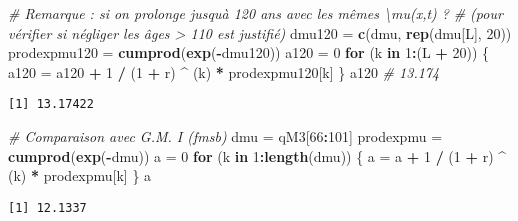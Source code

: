 \documentclass[
]{article}
\newenvironment{Shaded}{\begin{snugshade}}{\end{snugshade}}
\newcommand{\CommentTok}[1]{\textcolor[rgb]{0.56,0.35,0.01}{\textit{#1}}}
\newcommand{\ControlFlowTok}[1]{\textcolor[rgb]{0.13,0.29,0.53}{\textbf{#1}}}
\newcommand{\DecValTok}[1]{\textcolor[rgb]{0.00,0.00,0.81}{#1}}
\newcommand{\FunctionTok}[1]{\textcolor[rgb]{0.13,0.29,0.53}{\textbf{#1}}}
\newcommand{\NormalTok}[1]{#1}
\newcommand{\OtherTok}[1]{\textcolor[rgb]{0.56,0.35,0.01}{#1}}
\newcommand{\SpecialCharTok}[1]{\textcolor[rgb]{0.81,0.36,0.00}{\textbf{#1}}}
\begin{document}
\begin{Shaded}
\begin{Highlighting}[]
\CommentTok{\# Remarque : si on prolonge jusqu\textquotesingle{}à 120 ans avec les mêmes \textbackslash{}mu(x,t) ?}
\CommentTok{\# (pour vérifier si négliger les âges \textgreater{} 110 est justifié)}
\NormalTok{dmu120 }\OtherTok{=} \FunctionTok{c}\NormalTok{(dmu, }\FunctionTok{rep}\NormalTok{(dmu[L], }\DecValTok{20}\NormalTok{))}
\NormalTok{prodexpmu120 }\OtherTok{=} \FunctionTok{cumprod}\NormalTok{(}\FunctionTok{exp}\NormalTok{(}\SpecialCharTok{{-}}\NormalTok{dmu120))}
\NormalTok{a120 }\OtherTok{=} \DecValTok{0}
\ControlFlowTok{for}\NormalTok{ (k }\ControlFlowTok{in} \DecValTok{1}\SpecialCharTok{:}\NormalTok{(L }\SpecialCharTok{+} \DecValTok{20}\NormalTok{))}
\NormalTok{\{}
\NormalTok{  a120 }\OtherTok{=}\NormalTok{ a120 }\SpecialCharTok{+} \DecValTok{1} \SpecialCharTok{/}\NormalTok{ (}\DecValTok{1} \SpecialCharTok{+}\NormalTok{ r) }\SpecialCharTok{\^{}}\NormalTok{ (k) }\SpecialCharTok{*}\NormalTok{ prodexpmu120[k]}
\NormalTok{\}}
\NormalTok{a120 }\CommentTok{\# 13.174}
\end{Highlighting}
\end{Shaded}

\begin{verbatim}
[1] 13.17422
\end{verbatim}

\begin{Shaded}
\begin{Highlighting}[]
\CommentTok{\# Comparaison avec G.M. I  (fmsb)}
\NormalTok{dmu }\OtherTok{=}\NormalTok{ qM3[}\DecValTok{66}\SpecialCharTok{:}\DecValTok{101}\NormalTok{]}
\NormalTok{prodexpmu }\OtherTok{=} \FunctionTok{cumprod}\NormalTok{(}\FunctionTok{exp}\NormalTok{(}\SpecialCharTok{{-}}\NormalTok{dmu))}
\NormalTok{a }\OtherTok{=} \DecValTok{0}
\ControlFlowTok{for}\NormalTok{ (k }\ControlFlowTok{in} \DecValTok{1}\SpecialCharTok{:}\FunctionTok{length}\NormalTok{(dmu))}
\NormalTok{\{}
\NormalTok{  a }\OtherTok{=}\NormalTok{ a }\SpecialCharTok{+} \DecValTok{1} \SpecialCharTok{/}\NormalTok{ (}\DecValTok{1} \SpecialCharTok{+}\NormalTok{ r) }\SpecialCharTok{\^{}}\NormalTok{ (k) }\SpecialCharTok{*}\NormalTok{ prodexpmu[k]}
\NormalTok{\}}
\NormalTok{a}
\end{Highlighting}
\end{Shaded}

\begin{verbatim}
[1] 12.1337
\end{verbatim}
\end{document}
